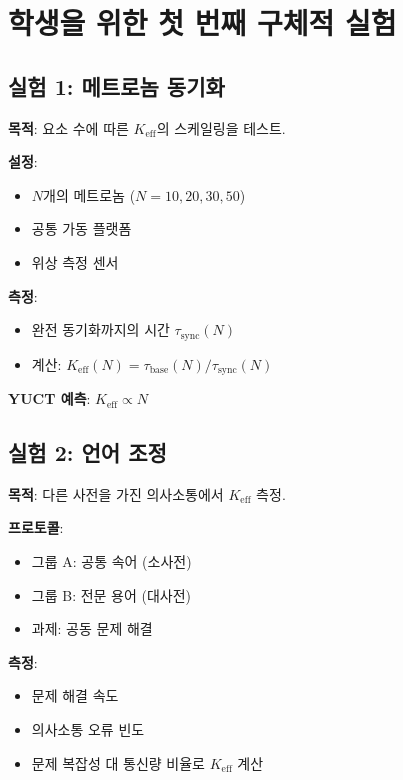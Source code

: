 \documentclass[12pt,a4paper]{article}
\begin{document}
	\section{학생을 위한 첫 번째 구체적 실험}
	
	\subsection{실험 1: 메트로놈 동기화}
	
	\textbf{목적}: 요소 수에 따른 $K_{\mathrm{eff}}$의 스케일링을 테스트.
	
	\textbf{설정}:
	\begin{itemize}
		\item $N$개의 메트로놈 ($N = 10, 20, 30, 50$)
		\item 공통 가동 플랫폼
		\item 위상 측정 센서
	\end{itemize}
	
	\textbf{측정}:
	\begin{itemize}
		\item 완전 동기화까지의 시간 $\tau_{\mathrm{sync}}(N)$
		\item 계산: $K_{\mathrm{eff}}(N) = \tau_{\mathrm{base}}(N)/\tau_{\mathrm{sync}}(N)$
	\end{itemize}
	
	\textbf{YUCT 예측}: $K_{\mathrm{eff}} \propto N$
	
	\subsection{실험 2: 언어 조정}
	
	\textbf{목적}: 다른 사전을 가진 의사소통에서 $K_{\mathrm{eff}}$ 측정.
	
	\textbf{프로토콜}:
	\begin{itemize}
		\item 그룹 A: 공통 속어 (소사전)
		\item 그룹 B: 전문 용어 (대사전)
		\item 과제: 공동 문제 해결
	\end{itemize}
	
	\textbf{측정}:
	\begin{itemize}
		\item 문제 해결 속도
		\item 의사소통 오류 빈도
		\item 문제 복잡성 대 통신량 비율로 $K_{\mathrm{eff}}$ 계산
	\end{itemize}
	
\end{document}
